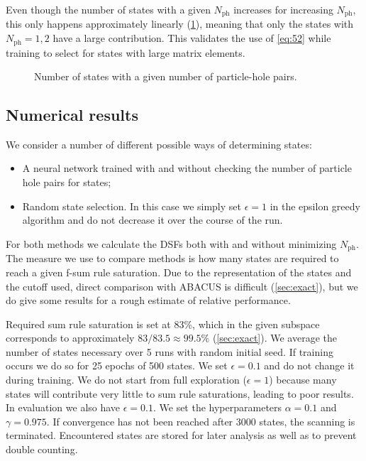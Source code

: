 \documentclass[11pt, a4paper]{report} %
\begin{document}
Even though the number of states with a given \(N_{\mathrm{ph}}\) increases for increasing \(N_{\mathrm{ph}}\), this only happens approximately linearly (\cref{fig:numberofstatesph}), meaning that only the states with \(N_{\mathrm{ph}}=1,2\) have a large contribution.
This validates the use of \cref{eq:52} while training to select for states with large matrix elements.
\begin{figure}[tb!]
  \centering
  \caption{Number of states with a given number of particle-hole pairs.}
  \label{fig:numberofstatesph}
\end{figure}




\subsection{Numerical results}


We consider a number of different possible ways of determining states:
\begin{itemize}
\item A neural network trained with and without checking the number of particle hole pairs for states;
\item Random state selection. In this case we simply set \(\epsilon=1\) in the epsilon greedy algorithm and do not decrease it over the course of the run.
\end{itemize}
For both methods we calculate the DSFs both with and without minimizing \(N_{\mathrm{ph}}\).
The measure we use to compare methods is how many states are required to reach a given f-sum rule saturation.
Due to the representation of the states and the cutoff used, direct comparison with ABACUS is difficult (\cref{sec:exact}), but we do give some results for a rough estimate of relative performance.

Required sum rule saturation is set at 83\%, which in the given subspace corresponds to approximately \(83/83.5\approx99.5\%\) (\cref{sec:exact}).
We average the number of states necessary over 5 runs with random initial seed.
If training occurs we do so for 25 epochs of 500 states.
We set \(\epsilon=0.1\) and do not change it during training.
We do not start from full exploration (\(\epsilon=1\)) because many states will contribute very little to sum rule saturations, leading to poor results.
In evaluation we also have \(\epsilon=0.1\).
We set the hyperparameters \(\alpha=0.1\) and \(\gamma = 0.975\).
If convergence has not been reached after 3000 states, the scanning is terminated.
Encountered states are stored for later analysis as well as to prevent double counting.
\end{document}

